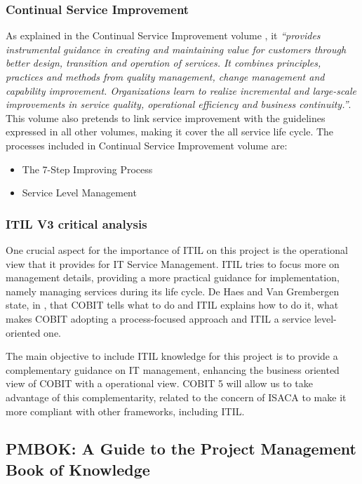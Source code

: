 \subsubsection{Continual Service Improvement}

As explained in the Continual Service Improvement volume \cite{itilST}, it \textit{``provides instrumental guidance in creating and maintaining value for customers through better design, transition and operation of services. It combines principles, practices and methods from quality management, change management and capability improvement. Organizations learn to realize incremental and large-scale improvements in service quality, operational efficiency and business continuity.''}. This volume also pretends to link service improvement with the guidelines expressed in all other volumes, making it cover the all service life cycle. The processes included in Continual Service Improvement volume are:

\begin{itemize}
  \item The 7-Step Improving Process
  \item Service Level Management
\end{itemize} 


\subsubsection{ITIL V3 critical analysis}

One crucial aspect for the importance of ITIL on this project is the operational view that it provides for IT Service Management. ITIL tries to focus more on management details, providing a more practical guidance for implementation, namely managing services during its life cycle. De Haes and Van Grembergen state, in \cite{ITGovAndMech}, that COBIT tells what to do and ITIL explains how to do it, what makes COBIT adopting a process-focused approach and ITIL a service level-oriented one.\par
The main objective to include ITIL knowledge for this project is to provide a complementary guidance on IT management, enhancing the business oriented view of COBIT with a operational view. COBIT 5 will allow us to take advantage of this complementarity, related to the concern of ISACA to make it more compliant with other frameworks, including ITIL. 

\subsection{PMBOK: A Guide to the Project Management Book of Knowledge}

